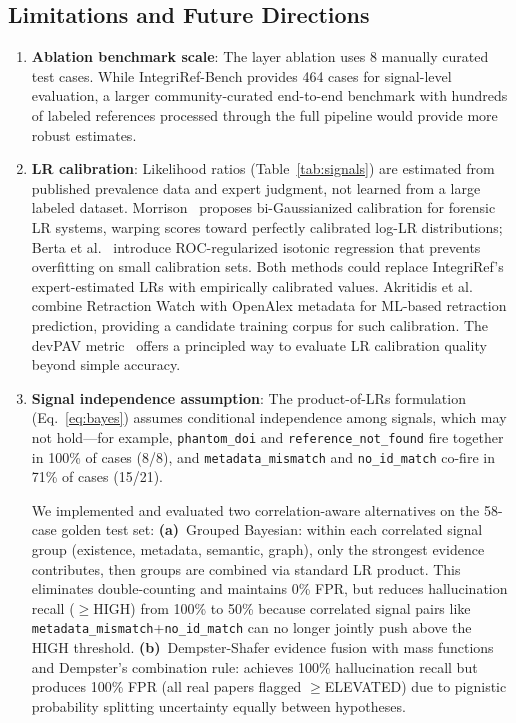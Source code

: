 \documentclass[sigconf,nonacm]{acmart}
\begin{document}
\subsection{Limitations and Future Directions}
\label{sec:limitations}

\begin{enumerate}
    \item \textbf{Ablation benchmark scale}: The layer ablation uses 8 manually curated test cases. While IntegriRef-Bench provides 464 cases for signal-level evaluation, a larger community-curated end-to-end benchmark with hundreds of labeled references processed through the full pipeline would provide more robust estimates.

    \item \textbf{LR calibration}: Likelihood ratios (Table~\ref{tab:signals}) are estimated from published prevalence data and expert judgment, not learned from a large labeled dataset.
    Morrison~\cite{morrison2024} proposes bi-Gaussianized calibration for forensic LR systems, warping scores toward perfectly calibrated log-LR distributions; Berta et al.~\cite{berta2024} introduce ROC-regularized isotonic regression that prevents overfitting on small calibration sets.
    Both methods could replace IntegriRef's expert-estimated LRs with empirically calibrated values.
    Akritidis et al.~\cite{akritidis2025} combine Retraction Watch with OpenAlex metadata for ML-based retraction prediction, providing a candidate training corpus for such calibration.
    The devPAV metric~\cite{ramos2021} offers a principled way to evaluate LR calibration quality beyond simple accuracy.

    \item \textbf{Signal independence assumption}: The product-of-LRs formulation (Eq.~\ref{eq:bayes}) assumes conditional independence among signals, which may not hold---for example, \texttt{phantom\_doi} and \texttt{reference\_not\_found} fire together in 100\% of cases (8/8), and \texttt{metadata\_mismatch} and \texttt{no\_id\_match} co-fire in 71\% of cases (15/21).

    We implemented and evaluated two correlation-aware alternatives on the 58-case golden test set:
    \textbf{(a)}~Grouped Bayesian: within each correlated signal group (existence, metadata, semantic, graph), only the strongest evidence contributes, then groups are combined via standard LR product.  This eliminates double-counting and maintains 0\% FPR, but reduces hallucination recall ($\geq$HIGH) from 100\% to 50\% because correlated signal pairs like \texttt{metadata\_mismatch}+\texttt{no\_id\_match} can no longer jointly push above the HIGH threshold.
    \textbf{(b)}~Dempster-Shafer evidence fusion with mass functions and Dempster's combination rule: achieves 100\% hallucination recall but produces 100\% FPR (all real papers flagged $\geq$ELEVATED) due to pignistic probability splitting uncertainty equally between hypotheses.


\end{enumerate}
\end{document}
